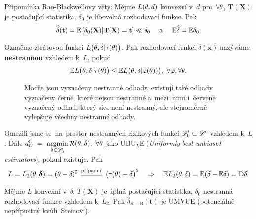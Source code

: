 \begin{remark}
	Připomínka Rao-Blackwellovy věty: Mějme $L(\theta,d)$ konvexní v~$d$ pro~$\forall\theta$, $\textbf{T}(\textbf{X})$ je postačující statistika, $\delta_0$ je libovolná rozhodovací funkce. Pak $$\widehat{\delta}(\textbf{t})=\mathbb{E}\left[ \delta_0(\textbf{X})|\textbf{T}(\textbf{X})=\textbf{t} \right]\ll \delta_0\quad\text{ a~}\quad\mathbb{E}\widehat{\delta}=\mathbb{E} \delta_0.$$
\end{remark}
\begin{define}
	Označme ztrátovou funkci $L\big(\theta,\delta|\tau(\theta)\big)$. Pak rozhodovací funkci $\delta(\textbf{x})$ nazýváme \textbf{nestrannou} vzhledem k~$L$, pokud $$ \mathbb{E} L\big(\theta,\delta|\tau(\theta)\big)\leq \mathbb{E} L\big(\theta,\delta|\varphi(\theta))\big),~\forall\varphi,\forall\theta.$$
\end{define}	\begin{figure}[h]
	\centering
	\caption{Modře jsou vyznačeny nestranné odhady, existují také odhady vyznačeny černě, které nejsou nestranné a~mezi~nimi i~červeně vyznačený odhad, který sice není nestranný, ale stejnoměrně vylepšuje všechny nestranné odhady.}
	\label{fig:3}
\end{figure}
Omezili jsme se~na~prostor nestranných rizikových funkcí $\mathscr{D}'_0\subset \mathscr{D}' $ vzhledem k~$L$. Dále
$ d_U^0~=~\mathop{\mathrm{argmin}}\limits_{\delta\in\mathscr{D}' _0}\mathcal{R}(\theta,\delta),~\forall\theta$ jako UBU$_L$E (\textit{Uniformly best unbiased estimators}), pokud existuje. Pak
$$ L=L_2(\t,\boldsymbol{\delta})=(\t-\delta)^2\equal{\text{případně}}\big(\tau(\t)-\delta\big)^2\quad\Rightarrow\quad \E L_2(\t,\delta)=\E (\delta-\E \delta)=\D \delta.$$


\begin{theorem}
	Mějme $L$ konvexní v~$\delta$, $T(\textbf{X})$ je úplná postačující statistika, $\delta_0$ nestranná rozhodovací funkce vzhledem k~$L_2$. Pak $\widehat{\delta}_\mathrm{R-B}(\textbf{t})$ je UMVUE (potenciálně nepřípustný kvůli~Steinovi).
	
	
\end{theorem}

